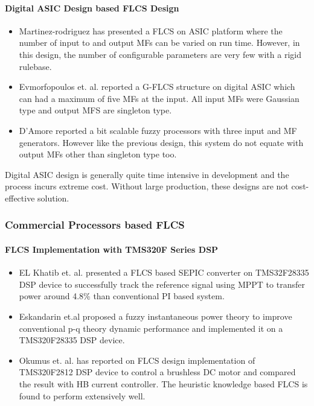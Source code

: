 \paragraph{Digital ASIC Design based FLCS Design}	
	\begin{itemize}
		\item Martinez-rodriguez \cite{Martinez-Rodriguez2015} has presented a FLCS on ASIC platform where the number of input to and output MFs can be varied on run time. {However, in this design, the number of configurable parameters are very few with a rigid rulebase.}
		\item Evmorfopoulos et. al. \cite{Evmorfopoulos2002} reported a G\hyp{}FLCS structure on digital ASIC which can {had a maximum of five MFs at the input. All input MFs were Gaussian type and output MFS are singleton type.}
		\item D'Amore \cite{DAmore2001} reported a bit scalable fuzzy processors with three input and MF generators. {However like the previous design, this system do not equate with output MFs other than singleton type too. }
	\end{itemize}
	Digital ASIC design is generally quite time intensive in development and the process incurs extreme cost. Without large production, these designs are not cost-effective solution.
\subsubsection{Commercial Processors based FLCS}

\paragraph{FLCS Implementation with TMS320F Series DSP}
\begin{itemize}
	\item EL Khatib et. al. \cite{ElKhateb2014} presented a FLCS based SEPIC converter on TMS32F28335 DSP device to successfully track the reference signal using MPPT to transfer power around 4.8\% than conventional PI based system.
	\item Eskandarin et.al \cite{Eskandarian2014} proposed a fuzzy instantaneous power theory to improve conventional p-q theory dynamic performance and implemented it on a TMS320F28335 DSP device.
	\item Okumus et. al. \cite{Okumus2014} has reported on FLCS design implementation of TMS320F2812 DSP device to control a brushless DC motor and compared the result with HB current controller. The heuristic knowledge based FLCS is found to perform extensively well.  
\end{itemize}

